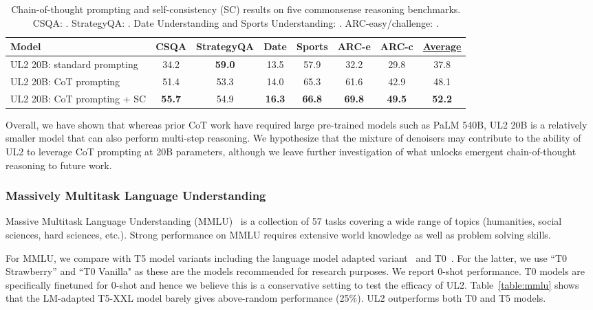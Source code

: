 \documentclass[10pt]{article}
\begin{document}
\begin{table}[H]
    \centering
    \small
      \caption{Chain-of-thought prompting and self-consistency (SC) results on five commonsense reasoning benchmarks.
      CSQA: \citep{talmor-etal-2019-commonsenseqa}.
      StrategyQA: \citep{geva-etal-2021-aristotle}.
      Date Understanding and Sports Understanding: \citep{srivastava2022beyond}.
      ARC-easy/challenge: \citep{ARC}.
      }
    \label{tab:cot-commonsense}
    \begin{tabular}{l ccccccc }
    \toprule 
    Model     & CSQA & StrategyQA & Date & Sports & ARC-e & ARC-c & \underline{Average} \\
    \midrule 
  UL2 20B: standard prompting & 34.2 & \textbf{59.0} & 13.5 & 57.9 & 32.2  & 29.8 & 37.8  \\
    UL2 20B: CoT prompting & 51.4 & 53.3 & 14.0 & 65.3 & 61.6 & 42.9 & 48.1 \\
    UL2 20B: CoT prompting + SC & \textbf{55.7} & 54.9  & \textbf{16.3} &\textbf{66.8} & \textbf{69.8}  & \textbf{49.5} & \textbf{52.2}\\
    \bottomrule
    \end{tabular}
\end{table}

Overall, we have shown that whereas prior CoT work have required large pre-trained models such as PaLM 540B, UL2 20B is a relatively smaller model that can also perform multi-step reasoning. 
We hypothesize that the mixture of denoisers may contribute to the ability of UL2 to leverage CoT prompting at 20B parameters, although we leave further investigation of what unlocks emergent chain-of-thought reasoning to future work.


\subsubsection{Massively Multitask Language Understanding}




Massive Multitask Language Understanding (MMLU)~\citep{hendrycks2021_mmlu} is a collection of 57 tasks covering a wide range of topics (humanities, social sciences, hard sciences, etc.). Strong performance on MMLU requires extensive world knowledge as well as problem solving skills.

For MMLU, we compare with T5 model variants including the language model adapted variant~\cite{lester2021power} and T0~\citep{sanh2019distilbert}. For the latter, we use ``T0 Strawberry'' and ``T0 Vanilla" as these are the models recommended for research purposes. We report 0-shot performance. T0 models are specifically finetuned for 0-shot and hence we believe this is a conservative setting to test the efficacy of UL2. Table~\ref{table:mmlu} shows that the LM-adapted T5-XXL model barely gives above-random performance (25\%). UL2 outperforms both T0 and T5 models.
\end{document}

